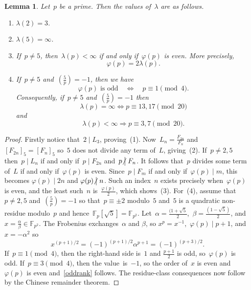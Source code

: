 \documentclass[10pt,a4paper]{amsart}
\numberwithin{equation}{section} %
\newtheorem{lemma}[thm]{Lemma}
\numberwithin{table}{section} %
\numberwithin{figure}{section}
\def\FF{\mathbb{F}}
\newcommand\notdivides{\mathrel{\kern-3pt\not\!\kern4.3pt\bigm|}}
\newcommand\divides\mid
\begin{document}
\begin{lemma}\label{lemmaTrivialLucas}
Let~$p$ be a prime. Then the values of~$\lambda$ are
as follows.
\begin{enumerate}
\item[\rm(1)] $\lambda(2)=3$.
\item[\rm(2)] $\lambda(5)=\infty$.
\item[\rm(3)] If~$p\ne5$, then~$\lambda(p)<\infty$ if and only
if~$\varphi(p)$ is even. More precisely,
\begin{equation*}\label{eq:twolambda}
 \varphi(p)=2\lambda(p).
 \end{equation*}
\item[\rm(4)] If~$p\ne5$ and~$\left(\frac5p\right)=-1$, then
we have
\begin{equation}\label{oddrank}
\varphi(p)\text{ is odd}\quad\Longleftrightarrow\quad p\equiv1\pmod4.
\end{equation}
Consequently, if~$p\neq5$ and~$\left(\frac5p\right)=-1$ then
\[
\lambda(p)=\infty
\Longleftrightarrow
p\equiv13,17\pmod{20}
\]
and
\[
\lambda(p)
<
\infty
\Longrightarrow
p\equiv3,7\pmod{20}.
\]
\end{enumerate}
\end{lemma}

\begin{proof}
Firstly notice that~$2\divides L_3$,
proving~(1).
Now~$L_n=\frac{F_{2n}}{F_{n}}$
and~$[F_{2n}]_5=[F_n]_{5}$ so~$5$
does not divide any term of~$L$,
giving~(2).
If~$p\neq2,5$ then~$p\divides L_n$ if and only
if~$p\divides F_{2n}$ and~$p\notdivides F_{n}$.
It follows that~$p$ divides some term of~$L$
if and only if~$\varphi(p)$ is even.
Since~$p\divides F_m$ if and only if~$\varphi(p)\divides m$,
this becomes $\varphi(p)\divides 2n$ and $\varphi (p)\notdivides n$.
Such an index~$n$ exists precisely when~$\varphi(p)$ is even,
and the least such~$n$ is~$\frac{\varphi(p)}{2}$,
which shows~(3).
For~(4), assume that~$p\ne2,5$ and~$\left(\frac5p\right)=-1$
so that~$p\equiv\pm 2$ modulo~$5$
and~$5$ is a quadratic non-residue modulo~$p$ and
hence~$\FF_p[\sqrt{5}]=\FF_{p^2}$.
Let~$\alpha=\frac{(1+\sqrt5}{2}$,~$\beta=\frac{(1-\sqrt5)}{2}$,
and~$x=\frac{\alpha}{\beta}\in\mathbb F_{p^2}$.
The Frobenius exchanges~$\alpha$ and $\beta$,
so $x^p=x^{-1}$,~$\varphi(p)\divides p+1$,
and~$x=-\alpha^2$ so
\[
 x^{(p+1)/2}=(-1)^{(p+1)/2}\alpha^{p+1}=(-1)^{(p+3)/2}.
\]
If~$p\equiv1\pmod4$, then the right-hand side is~$1$
and $\frac{p+1}{2}$ is odd, so~$\varphi(p)$ is odd.
If~$p\equiv3\pmod4$, then the value~is~$-1$, so the order of~$x$ is even
and~$\varphi(p)$ is even and~\eqref{oddrank}
follows.
The residue-class consequences now follow by the Chinese remainder theorem.
\end{proof}
\end{document}
